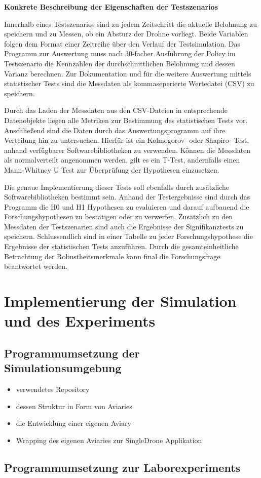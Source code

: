 \textbf{Konkrete Beschreibung der Eigenschaften der Testszenarios}

Innerhalb eines Testszenarios sind zu jedem Zeitschritt die aktuelle Belohnung zu speichern und zu Messen, ob ein Absturz der Drohne vorliegt.
Beide Variablen folgen dem Format einer Zeitreihe über den Verlauf der Testsimulation.
Das Programm zur Auswertung muss nach 30-facher Ausführung der Policy im Testszenario die Kennzahlen der durchschnittlichen Belohnung und dessen Varianz berechnen.
Zur Dokumentation und für die weitere Auswertung mittels statistischer Tests sind die Messdaten als kommaseperierte Wertedatei (CSV) zu speichern.

Durch das Laden der Messdaten aus den CSV-Dateien in entsprechende Datenobjekte liegen alle Metriken zur Bestimmung des statistischen Tests vor.
Anschließend sind die Daten durch das Auswertungsprogramm auf ihre Verteilung hin zu untersuchen.
Hierfür ist ein Kolmogorov- oder Shapiro- Test, anhand verfügbarer Softwarebibliotheken zu verwenden.
Können die Messdaten als normalverteilt angenommen werden, gilt es ein T-Test, andernfalls einen Mann-Whitney U Test zur Überprüfung der Hypothesen einzusetzen.

Die genaue Implementierung dieser Tests soll ebenfalls durch zusätzliche Softwarebibliotheken bestimmt sein.
Anhand der Testergebnisse sind durch das Programm die H0 und H1 Hypothesen zu evaluieren und darauf aufbauend die Forschungshypothesen zu bestätigen oder zu verwerfen.
Zusätzlich zu den Messdaten der Testszenarien sind auch die Ergebnisse der Signifikanztests zu speichern.
Schlussendlich sind in einer Tabelle zu jeder Forschungshypothese die Ergebnisse der statistischen Tests anzuführen.
Durch die gesamteinheitliche Betrachtung der Robustheitsmerkmale kann final die Forschungsfrage beantwortet werden.

\section{Implementierung der Simulation und des Experiments}
\subsection{Programmumsetzung der Simulationsumgebung}
\begin{itemize}
    \item verwendetes Repository
    \item dessen Struktur in Form von Aviaries
    \item die Entwicklung einer eigenen Aviary 
    \item Wrapping des eigenen Aviaries zur SingleDrone Applikation
\end{itemize}
\subsection{Programmumsetzung zur Laborexperiments}
